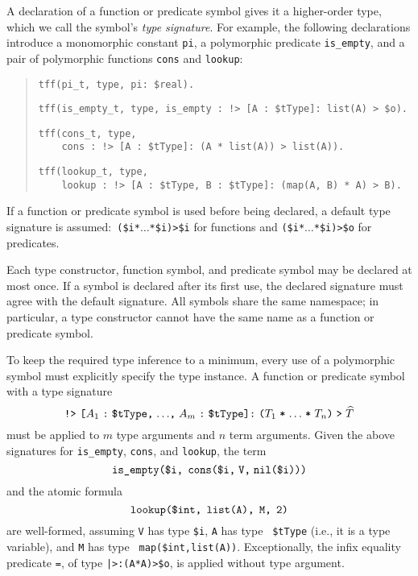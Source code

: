 A declaration of a function or predicate symbol gives it a higher-order
type, which we call the symbol's {\em type signature}. For example, the following
declarations introduce a monomorphic constant {\tt pi}, a polymorphic predicate
{\tt is\_empty}, and a pair of polymorphic functions {\tt cons} and {\tt lookup}:
\begin{quote}
\verb+tff(pi_t, type, pi: $real).+
\par\smallskip
\verb+tff(is_empty_t, type, is_empty : !> [A : $tType]: list(A) > $o).+
\par\smallskip
\verb+tff(cons_t, type,+\\
\verb+    cons : !> [A : $tType]: (A * list(A)) > list(A)).+
\par\smallskip
\verb+tff(lookup_t, type,+\\
\verb+    lookup : !> [A : $tType, B : $tType]: (map(A, B) * A) > B).+
\end{quote}
If a function or predicate symbol is used before being declared, a
default type signature is assumed:\ {\tt (\$i\;*\;${\dots}$\;*\;\$i)\;>\;\$i}
for functions and {\tt (\$i\;*\;${\dots}$\;*\;\$i)\;>\;\$o} for predicates.

Each type constructor, function symbol, and predicate symbol may be declared at
most once. If a symbol is declared after its first use, the declared signature
must agree with the default signature. All symbols share the same namespace; in
particular, a type constructor cannot have the same name as a function or
predicate symbol.


 To keep the required type
inference to a minimum, every use of a polymorphic symbol must explicitly
specify the type instance. A function or predicate symbol with a type signature
\[\hbox{{\tt !>} {\tt [$A_1$\;:\;\$tType,\;${\dots}$,\;$A_m$\;:\;\$tType]:\;%
($T_1$\;*\;${\dots}$\;*\;$T_n$)\;>\;$\widehat T$}}\]
must be applied to $m$ type arguments and $n$ term arguments. Given the above
signatures for {\tt is\_empty}, {\tt cons}, and {\tt lookup}, the term
\[\hbox{\tt is\_empty(\$i,\;\,cons(\$i,\;V,\;nil(\$i)))}\]
and the atomic formula
\[\hbox{\tt lookup(\$int,\;\,list(A),\;\,M,\;\,2)}\]
are well-formed, assuming {\tt V} has type {\tt \$i}, {\tt A} has type {\tt
\$tType} (i.e., it is a type variable), and {\tt M} has type {\tt
map(\$int,\;list(A))}.
Exceptionally, the infix equality predicate {\tt =}, of type
{\tt |>\;[A\;:\;\$tType]:\;(A\;*\;A)\;>\;\$o}, is applied without type argument.

